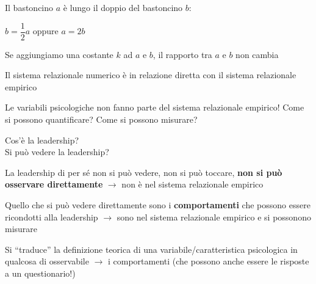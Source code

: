\documentclass[compress]{beamer}
\begin{document}
\begin{frame}
	
	
	Il bastoncino $a$ è lungo il doppio del bastoncino $b$: 
	
	\begin{block}%
		
		$b = \dfrac{1}{2}a$ \hspace{1.5mm} oppure $a = 2b$
		
		\vspace{1.5mm}
		Se aggiungiamo una costante $k$ ad $a$ e $b$, il rapporto tra $a$ e $b$ non cambia
	\end{block}
	
	Il sistema relazionale numerico è in relazione diretta con il sistema relazionale empirico
	
	\pause
	\vspace{2mm}
	Le variabili psicologiche non fanno parte del sistema relazionale empirico! Come si possono quantificare? Come si possono misurare?
\end{frame}


\begin{frame}
	\begin{center}
		Cos'è la {\Large{leadership}}?
		\pause
		\\\vspace{1.5mm} Si può vedere la leadership?
	\end{center}
	
	\pause
	La leadership di per sé non si può vedere, non si può toccare, \textbf{non si può osservare direttamente} $\rightarrow$ non è nel sistema relazionale empirico
	
	\vspace{1.5mm}
	
	Quello che si può vedere direttamente sono i \textbf{comportamenti} che possono essere ricondotti alla leadership $\rightarrow$ sono nel sistema relazionale empirico e si possonono misurare 
	
	Si ``traduce'' la definizione teorica di una variabile/caratteristica psicologica in qualcosa di osservabile $\rightarrow$ i comportamenti (che possono anche essere le risposte a un questionario!)
\end{frame}
\end{document}
